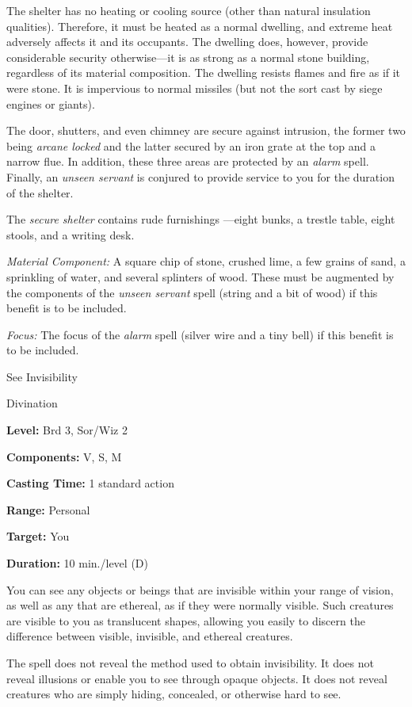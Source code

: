 \documentclass{article}
\begin{document}
The shelter has no heating or cooling source (other than natural insulation qualities). 
Therefore, it must be heated as a normal dwelling, and extreme heat adversely affects 
it and its occupants. The dwelling does, however, provide considerable security 
otherwise---it is as strong as a normal stone building, regardless of its material 
composition. The dwelling resists flames and fire as if it were stone. It is impervious 
to normal missiles (but not the sort cast by siege engines or giants).

The door, shutters, and even chimney are secure against intrusion, the former two 
being \textit{arcane locked }and the latter secured by an iron grate at the top 
and a narrow flue. In addition, these three areas are protected by an \textit{alarm 
}spell. Finally, an \textit{unseen servant }is conjured to provide service to you 
for the duration of the shelter.

The \textit{secure shelter }contains rude furnishings ---eight bunks, a trestle 
table, eight stools, and a writing desk.

\textit{Material Component: }A square chip of stone, crushed lime, a few grains 
of sand, a sprinkling of water, and several splinters of wood. These must be augmented 
by the components of the \textit{unseen servant }spell (string and a bit of wood) 
if this benefit is to be included.

\textit{Focus: }The focus of the \textit{alarm }spell (silver wire and a tiny bell) 
if this benefit is to be included.

\vspace{12pt}
See Invisibility

Divination

\textbf{Level:} Brd 3, Sor/Wiz 2

\textbf{Components:} V, S, M

\textbf{Casting Time:} 1 standard action

\textbf{Range:} Personal

\textbf{Target:} You

\textbf{Duration:} 10 min./level (D)

You can see any objects or beings that are invisible within your range of vision, 
as well as any that are ethereal, as if they were normally visible. Such creatures 
are visible to you as translucent shapes, allowing you easily to discern the difference 
between visible, invisible, and ethereal creatures.

The spell does not reveal the method used to obtain invisibility. It does not reveal 
illusions or enable you to see through opaque objects. It does not reveal creatures 
who are simply hiding, concealed, or otherwise hard to see.
\end{document}
